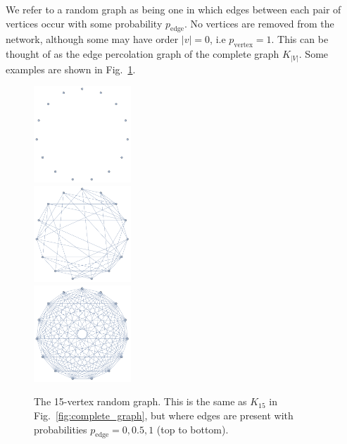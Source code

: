 We refer to a random graph as being one in which edges between each pair of vertices occur with some probability $p_\mathrm{edge}$. No vertices are removed from the network, although some may have order \mbox{$|v|=0$}, i.e \mbox{$p_\mathrm{vertex}=1$}. This can be thought of as the edge percolation graph of the complete graph $K_{|V|}$. Some examples are shown in Fig.~\ref{fig:random_graph}.

\pubmode
	\begin{figure}[!htbp]
	\includegraphics[clip=true, width=0.325\textwidth]{random_0}\\
	\includegraphics[clip=true, width=0.325\textwidth]{random_05}\\
	\includegraphics[clip=true, width=0.325\textwidth]{random_1}
	\captionspacefig \caption{The 15-vertex random graph. This is the same as $K_{15}$ in Fig.~\ref{fig:complete_graph}, but where edges are present with probabilities \mbox{$p_\mathrm{edge}=0,0.5,1$} (top to bottom).} \label{fig:random_graph}
	\end{figure}
\else
